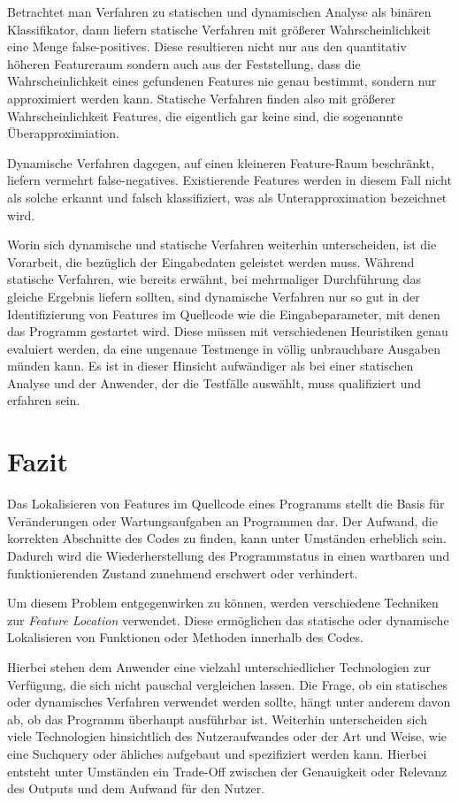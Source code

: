\documentclass[runningheads,a4paper]{llncs}
\begin{document}
Betrachtet man Verfahren zu statischen und dynamischen Analyse als binären Klassifikator, dann liefern statische Verfahren mit größerer 
Wahrscheinlichkeit eine Menge false-positives. Diese resultieren nicht nur aus den quantitativ höheren Featureraum sondern auch aus
der Feststellung, dass die Wahrscheinlichkeit eines gefundenen Features nie genau bestimmt, sondern nur approximiert werden kann. Statische
Verfahren finden also mit größerer Wahrscheinlichkeit Features, die eigentlich gar keine sind, die sogenannte Überapproximiation.

Dynamische Verfahren dagegen, auf einen kleineren Feature-Raum beschränkt, liefern vermehrt false-negatives. Existierende Features
werden in diesem Fall nicht als solche erkannt und falsch klassifiziert, was als Unterapproximation bezeichnet wird.

Worin sich dynamische und statische Verfahren weiterhin unterscheiden, ist die Vorarbeit, die bezüglich der Eingabedaten geleistet werden muss. Während statische Verfahren, wie bereits erwähnt, bei mehrmaliger Durchführung das gleiche Ergebnis liefern sollten, sind dynamische Verfahren nur so gut in der Identifizierung von Features im Quellcode wie die Eingabeparameter, mit denen das Programm gestartet wird. Diese müssen mit verschiedenen Heuristiken genau evaluiert werden, da eine ungenaue Testmenge in völlig unbrauchbare Ausgaben münden kann. Es ist in dieser Hinsicht aufwändiger als bei einer statischen Analyse und der Anwender, der die Testfälle auswählt, muss qualifiziert und erfahren sein.

\clearpage

\section{Fazit}

Das Lokalisieren von Features im Quellcode eines Programms stellt die Basis für Veränderungen oder Wartungsaufgaben an Programmen dar. Der Aufwand, die korrekten Abschnitte des Codes zu finden, kann unter Umständen erheblich sein. Dadurch wird die Wiederherstellung des Programmstatus in einen wartbaren und funktionierenden Zustand zunehmend erschwert oder verhindert.

Um diesem Problem entgegenwirken zu können, werden verschiedene Techniken zur \textit{Feature Location} verwendet. Diese ermöglichen das statische oder dynamische Lokalisieren von Funktionen oder Methoden innerhalb des Codes.

Hierbei stehen dem Anwender eine vielzahl unterschiedlicher Technologien zur Verfügung, die sich nicht pauschal vergleichen lassen. Die Frage, ob ein statisches oder dynamisches Verfahren verwendet werden sollte, hängt unter anderem davon ab, ob das Programm überhaupt ausführbar ist. Weiterhin unterscheiden sich viele Technologien hinsichtlich des Nutzeraufwandes oder der Art und Weise, wie eine Suchquery oder ähliches aufgebaut und spezifiziert werden kann. Hierbei entsteht unter Umständen ein Trade-Off zwischen der Genauigkeit oder Relevanz des Outputs und dem Aufwand für den Nutzer.
\end{document}
